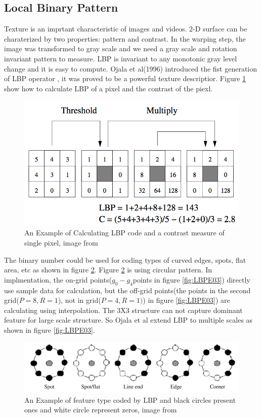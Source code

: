 \subsection{Local Binary Pattern}
Texture is an imprtant characteristic of images and videos. 2-D surface can be charaterized by two properties: pattern and contrast. In the warping step, the image was transformed to gray scale and we need a gray scale and rotation invariant pattern to measure. LBP is invariant to any monotonic gray level change and it is easy to compute. Ojala et al(1996) introduced the fist generation of LBP operator \cite{shan2009facial}, it was proved to be a powerful texture descriptior. Figure \ref{fig:LBPE01} show how to calculate LBP of a pixel and the contrast of the piexl.
\begin{figure}[ht]
\centering
\captionsetup{justification=centering,margin=3cm}
\includegraphics[width = .6\textwidth]{imgs/LBP_Example_1.png}
\caption{An Example of Calculating LBP code and \newline a contrast measure of single pixel, image from \cite{maenpaa2005texture}}
\label{fig:LBPE01}
\end{figure}
\newline
The binary number could be used for coding types of curved edges, spots, flat area, etc as shown in figure \ref{fig:LBPE02}. Figure \ref{fig:LBPE02} is using circular pattern. In implmentation, the on-grid points($g_{0}-g_{4}$points in figure \ref{fig:LBPE03}) directly use sample data for calculation, but the off-grid points(the points in the second grid($P=8,R=1$), not in grid($P=4,R=1)$) in figure \ref{fig:LBPE03}) are calculating using interpolation. The 3X3 structure can not capture dominant feature for large scale structure\cite{shan2009facial}. So Ojala et al extend LBP to multiple scales as shown in figure \ref{fig:LBPE03}.
\begin{figure}[ht]
\centering
\captionsetup{justification=centering,margin=3cm}
\includegraphics[width = .6\textwidth]{imgs/LBP_Example_2.png}
\caption{An Example of feature type coded by LBP and \newline black circles present ones and white circle represent zeros, image from \cite{shan2009facial}}
\label{fig:LBPE02}
\end{figure}
